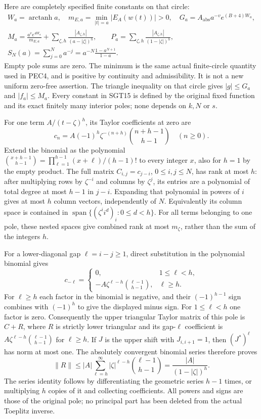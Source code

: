 \documentclass[10pt]{article}
\begin{document}
Here are completely specified finite constants on that circle:
\[
\begin{gathered}
 W_a=\operatorname{arctanh}a,\quad
 m_{E,a}=\min_{|t|=a}|E_A(w(t))|>0,\quad
 G_a=A_{\mathrm{abs}}a^{-v}e^{(B+4)W_a},\\
 M_a=\frac{a^ve^{4W_a}}{m_{E,a}}
       +\sum_{\zeta,h}\frac{|A_{\zeta,h}|}{(a-|\zeta|)^h},
 \qquad
 P_a=\sum_{\zeta,h}\frac{|A_{\zeta,h}|}{(1-|\zeta|)^h},\\
 S_N(a)=\sum_{j=0}^Na^{-j}
       =a^{-N}\frac{1-a^{N+1}}{1-a}.
\end{gathered}\tag{SGT15}
\]
Empty pole sums are zero. The minimum is the same actual finite-circle
quantity used in PEC4, and is positive by continuity and admissibility.
It is not a new uniform zero-free assertion. The triangle inequality on
that circle gives $|g|\le G_a$ and $|f_a|\le M_a$.
Every constant in SGT15 is defined by the original fixed function and
its exact finitely many interior poles; none depends on $k,N$ or $s$.

For one term $A/(t-\zeta)^h$, its Taylor coefficients at zero are
\[
 c_n=A(-1)^h\zeta^{-(n+h)}
             \binom{n+h-1}{h-1}\quad(n\ge0).
 \tag{SGT16}
\]
Extend the binomial as the polynomial
$\binom{x+h-1}{h-1}=\prod_{\ell=1}^{h-1}(x+\ell)/(h-1)!$
to every integer $x$, also for $h=1$ by the empty product.
The full matrix $C_{i,j}=c_{j-i}$, $0\le i,j\le N$, has rank at most
$h$: after multiplying rows by $\zeta^{-i}$ and columns by $\zeta^j$,
its entries are a polynomial of total degree at most $h-1$ in $j-i$.
Expanding that polynomial in powers of $i$ gives at most $h$ column
vectors, independently of $N$. Equivalently its column space is
contained in $\operatorname{span}\{(\zeta^ii^d)_i:0\le d<h\}$.
For all terms belonging to one pole, these nested spaces give combined
rank at most $m_\zeta$, rather than the sum of the integers $h$.

For a lower-diagonal gap $\ell=i-j\ge1$, direct substitution in
the polynomial binomial gives
\[
 c_{-\ell}=
 \begin{cases}
 0,&1\le\ell<h,\\
 -A\zeta^{\ell-h}\binom{\ell-1}{h-1},&\ell\ge h .
 \end{cases}\tag{SGT17}
\]
For $\ell\ge h$ each factor in the binomial is negative, and their
$(-1)^{h-1}$ sign combines with $(-1)^h$ to give the displayed
minus sign. For $1\le\ell<h$ one factor is zero.
Consequently the upper triangular Taylor matrix of this pole is
$C+R$, where $R$ is strictly lower triangular and its gap-$\ell$
coefficient is $A\zeta^{\ell-h}\binom{\ell-1}{h-1}$ for $\ell\ge h$.
If $J$ is the upper shift with $J_{i,i+1}=1$, then
$(J^*)^\ell$ has norm at most one. The absolutely convergent binomial
series therefore proves
\[
 \|R\|\le |A|\sum_{\ell=h}^{\infty}
                 |\zeta|^{\ell-h}\binom{\ell-1}{h-1}
          =\frac{|A|}{(1-|\zeta|)^h}.
 \tag{SGT18}
\]
The series identity follows by differentiating the geometric series
$h-1$ times, or multiplying $h$ copies of it and collecting coefficients.
All powers and signs are those of the original pole; no principal
part has been deleted from the actual Toeplitz inverse.
\end{document}
